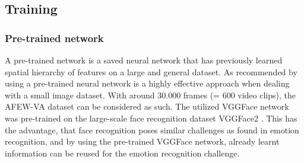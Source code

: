 \subsection{Training} \label{sec:Training&Regularization}
\subsubsection{Pre-trained network}
A pre-trained network is a saved neural network that has previously learned spatial hierarchy of features on a large and general dataset. As recommended by \citet{Chollet:2017:DeepLearningPython} using a pre-trained neural network is a highly effective approach when dealing with a small image dataset. With around 30.000 frames (= 600 video clips), the AFEW-VA dataset \citep{Kossaifi:2017:AFEW-VADatabase} can be considered as such. The utilized VGGFace network was pre-trained on the large-scale face recognition dataset VGGFace2 \citep{Cao:2018:VGGFace2}. This has the advantage, that face recognition poses similar challenges as found in emotion recognition, and by using the pre-trained VGGFace network, already learnt information can be reused for the emotion recognition challenge.

